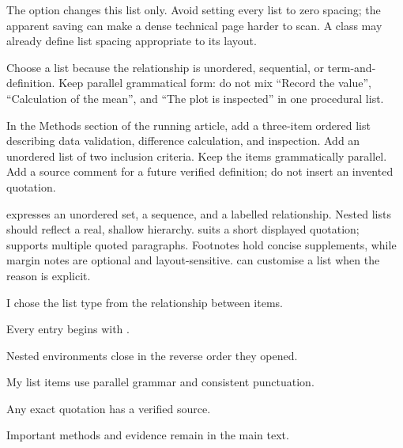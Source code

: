 The option changes this list only. Avoid setting every list to zero spacing;
the apparent saving can make a dense technical page harder to scan. A class
may already define list spacing appropriate to its layout.

\begin{goodpractice}
Choose a list because the relationship is unordered, sequential, or
term-and-definition. Keep parallel grammatical form: do not mix ``Record the
value'', ``Calculation of the mean'', and ``The plot is inspected'' in one
procedural list.
\end{goodpractice}

\chapterproject

\begin{miniproject}
In the Methods section of the running article, add a three-item ordered list
describing data validation, difference calculation, and inspection. Add an
unordered list of two inclusion criteria. Keep the items grammatically
parallel. Add a source comment for a future verified definition; do not insert
an invented quotation.
\end{miniproject}

\chaptersummary

 expresses an unordered set,  a sequence, and
 a labelled relationship. Nested lists should reflect a
real, shallow hierarchy.  suits a short displayed quotation;
 supports multiple quoted paragraphs. Footnotes hold concise
supplements, while margin notes are optional and layout-sensitive.
 can customise a list when the reason is explicit.

\chaptercheck
\begin{chapterchecklist}
  \item I chose the list type from the relationship between items.
  \item Every entry begins with .
  \item Nested environments close in the reverse order they opened.
  \item My list items use parallel grammar and consistent punctuation.
  \item Any exact quotation has a verified source.
  \item Important methods and evidence remain in the main text.
\end{chapterchecklist}

